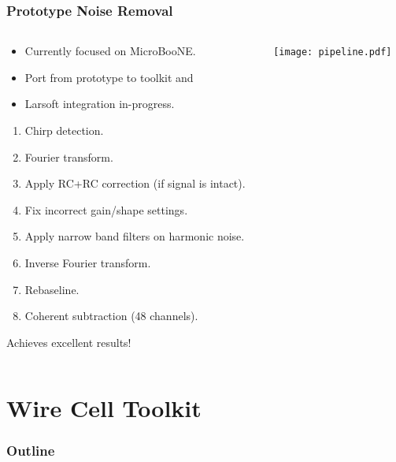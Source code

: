 \documentclass[xcolor=dvipsnames]{beamer}
\begin{document}
\begin{frame}
  \frametitle{Prototype Noise Removal}

  \vspace{-10mm}

  \begin{columns}

    \begin{column}{0.65\textwidth}

      \begin{itemize}
      \item Currently focused on MicroBooNE.
      \item Port from prototype to toolkit and
      \item Larsoft integration in-progress.
      \end{itemize}

      \begin{enumerate}\footnotesize
      \item Chirp detection.
      \item Fourier transform.
      \item Apply RC+RC correction (if signal is intact).
      \item Fix incorrect gain/shape settings.
      \item Apply narrow band filters on harmonic noise.
      \item Inverse Fourier transform.
      \item Rebaseline.
      \item Coherent subtraction (48 channels).
      \end{enumerate}
      Achieves excellent results!

    \end{column}
    \begin{column}{0.35\textwidth}

      \texttt{[image: pipeline.pdf]}

    \end{column}
  \end{columns}
\end{frame}

\section{Wire Cell Toolkit}

\begin{frame}
  \frametitle{Outline}
  \tableofcontents[currentsection]
\end{frame}
\end{document}
